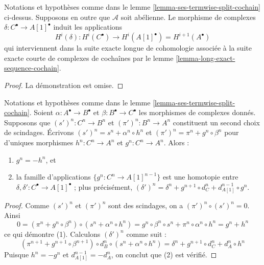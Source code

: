 \begin{lemma}
\label{lemma-ses-termwise-split-long-cochain}
Notations et hypothèses comme dans le
lemme \ref{lemma-ses-termwise-split-cochain} ci-dessus.
Supposons en outre que $\mathcal{A}$ soit abélienne.
Le morphisme de complexes $\delta : C^\bullet \to A[1]^\bullet$
induit les applications
$$
H^i(\delta) :
H^i(C^\bullet) \longrightarrow H^i(A[1]^\bullet) = H^{i + 1}(A^\bullet)
$$
qui interviennent dans la suite exacte longue de cohomologie associée
à la suite exacte courte de complexes de cochaînes par le
lemme \ref{lemma-long-exact-sequence-cochain}.
\end{lemma}

\begin{proof}
La démonstration est omise.
\end{proof}

\begin{lemma}
\label{lemma-ses-termwise-split-homotopy-cochain}
Notations et hypothèses comme dans le
lemme \ref{lemma-ses-termwise-split-cochain}.
Soient $\alpha : A^\bullet \to B^\bullet$ et
$\beta : B^\bullet \to C^\bullet$ les
morphismes de complexes donnés.
Supposons que $(s')^n : C^n \to B^n$ et $(\pi')^n : B^n \to A^n$
constituent un second choix de scindages.
Écrivons $(s')^n = s^n + \alpha^n \circ h^n$ et
$(\pi')^n = \pi^n + g^n \circ \beta^n$ pour d'uniques
morphismes $h^n : C^n \to A^n$ et $g^n : C^n \to A^n$. Alors :
\begin{enumerate}
\item $g^n = - h^n$, et
\item la famille d'applications $\{g^n : C^n \to A[1]^{n - 1}\}$ est une homotopie
entre $\delta, \delta' : C^\bullet \to A[1]^\bullet$ ; plus précisément,
$(\delta')^n = \delta^n + g^{n + 1} \circ d_C^n + d_{A[1]}^{n - 1} \circ g^n$.
\end{enumerate}
\end{lemma}

\begin{proof}
Comme $(s')^n$ et $(\pi')^n$ sont des scindages, on a $(\pi')^n \circ (s')^n = 0$.
Ainsi
$$
0 = ( \pi^n + g^n \circ \beta^n ) \circ ( s^n + \alpha^n \circ h^n ) =
g^n \circ \beta^n \circ s^n + \pi^n \circ \alpha^n \circ h^n =
g^n + h^n
$$
ce qui démontre (1). Calculons $(\delta')^n$ comme suit :
$$
( \pi^{n + 1} + g^{n + 1} \circ \beta^{n + 1} )
\circ d_B^n \circ
( s^n + \alpha^n \circ h^n )
= \delta^n + g^{n + 1} \circ d_C^n + d_A^n \circ h^n
$$
Puisque $h^n = -g^n$ et $d_{A[1]}^{n - 1} = -d_A^n$, on conclut que (2)
est vérifié.
\end{proof}




